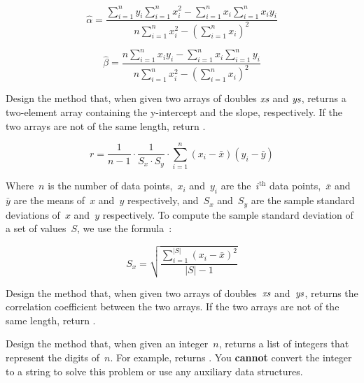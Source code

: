 \[
    \hat\alpha = \frac{\sum_{i=1}^{n}y_i \sum_{i=1}^{n}x_i^2 - \sum_{i=1}^{n}x_i \sum_{i=1}^{n}x_i{}y_i}{n  \sum_{i=1}^{n}x_i^2 - \left(\sum_{i=1}^{n}x_i\right)^2}
\]

\[
    \hat{\beta} = \frac{n \sum_{i=1}^{n}x_i{}y_i - \sum_{i=1}^{n}x_i \sum_{i=1}^{n}y_i}{n \sum_{i=1}^{n}x_i^2 - \left(\sum_{i=1}^{n}x_i\right)^2}
\]

Design the  method that, when given two arrays of doubles $\emph{xs}$ and $\emph{ys}$, returns a two-element array containing the y-intercept and the slope, respectively. If the two arrays are not of the same length, return .


\[
    r = \frac{1}{n-1}\cdot\frac{1}{S_x\cdot{}S_y}\cdot\sum_{i=1}^{n}(x_i - \bar{x})(y_i - \bar{y})  
\]

Where~$n$ is the number of data points,~$x_i$ and~$y_i$ are the~$i^\text{th}$ data points,~$\bar{x}$ and~$\bar{y}$ are the means of~$x$ and~$y$ respectively, and~$S_x$ and~$S_y$ are the sample standard deviations of~$x$ and~$y$ respectively. To compute the sample standard deviation of a set of values~$S$, we use the formula~\citep{stats}:

\[
    S_x = \sqrt{\frac{\sum_{i=1}^{|S|}(x_i - \bar{x})^2}{|S|-1}}
\]

Design the  method that, when given two arrays of doubles~$\emph{xs}$ and~$\emph{ys}$, returns the correlation coefficient between the two arrays. If the two arrays are not of the same length, return .

Design the  method that, when given an integer~$n$, returns a list of integers that represent the digits of~$n$. For example,  returns \ttt{[1, 2, 3]}. You \textbf{cannot} convert the integer to a string to solve this problem or use any auxiliary data structures.

